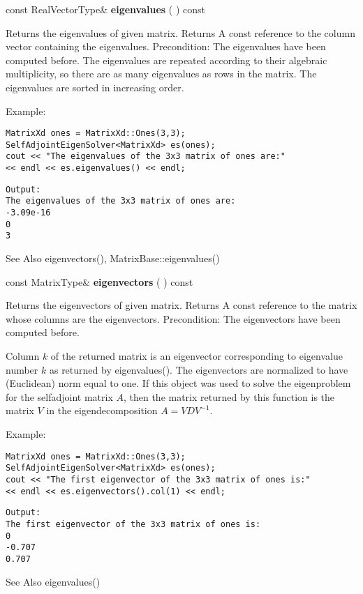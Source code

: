 \vspace{0.3cm}
const RealVectorType\& \textbf{eigenvalues}  ( )  const 

Returns the eigenvalues of given matrix. 
Returns A const reference to the column vector containing the eigenvalues.
Precondition: The eigenvalues have been computed before.
The eigenvalues are repeated according to their algebraic multiplicity, so there are as many eigenvalues as rows in the matrix. The eigenvalues are sorted in increasing order.


Example:
\begin{lstlisting}
MatrixXd ones = MatrixXd::Ones(3,3);
SelfAdjointEigenSolver<MatrixXd> es(ones);
cout << "The eigenvalues of the 3x3 matrix of ones are:"      
<< endl << es.eigenvalues() << endl;
\end{lstlisting}

\begin{verbatim}
Output:
The eigenvalues of the 3x3 matrix of ones are:
-3.09e-16
0
3
\end{verbatim}

See Also eigenvectors(), MatrixBase::eigenvalues() 


\vspace{0.3cm}
const MatrixType\& \textbf{eigenvectors}  ( )  const 

Returns the eigenvectors of given matrix. 
Returns A const reference to the matrix whose columns are the eigenvectors.
Precondition: The eigenvectors have been computed before.

Column $k$ of the returned matrix is an eigenvector corresponding to eigenvalue number $k$ as returned by eigenvalues(). The eigenvectors are normalized to have (Euclidean) norm equal to one. If this object was used to solve the eigenproblem for the selfadjoint matrix $A$, then the matrix returned by this function is the matrix $V$ in the eigendecomposition $A=V D V^{-1}$.


Example:
\begin{lstlisting}
MatrixXd ones = MatrixXd::Ones(3,3);
SelfAdjointEigenSolver<MatrixXd> es(ones);
cout << "The first eigenvector of the 3x3 matrix of ones is:"      
<< endl << es.eigenvectors().col(1) << endl;
\end{lstlisting}

\begin{verbatim}
Output:
The first eigenvector of the 3x3 matrix of ones is:
0
-0.707
0.707
\end{verbatim}
See Also eigenvalues() 


